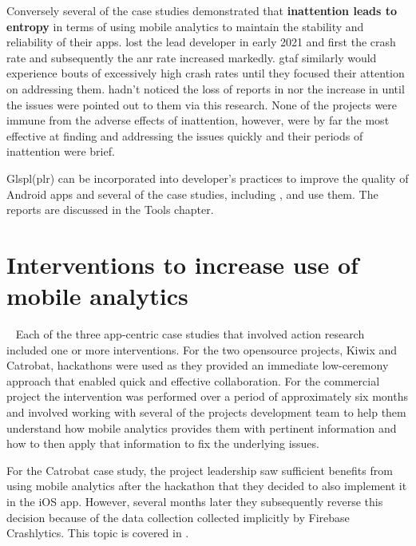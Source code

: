 Conversely several of the case studies demonstrated that \textbf{inattention leads to entropy} in terms of using mobile analytics to maintain the stability and reliability of their apps.  lost the lead developer in early 2021 and first the crash rate and subsequently the \Gls{anr} rate increased markedly. \Gls{gtaf} similarly would experience bouts of excessively high crash rates until they focused their attention on addressing them.  hadn't noticed the loss of reports in  nor the increase in  until the issues were pointed out to them via this research. None of the projects were immune from the adverse effects of inattention, however,  were by far the most effective at finding and addressing the issues quickly and their periods of inattention were brief.

Glspl(plr) can be incorporated into developer's practices to improve the quality of Android apps and several of the case studies, including ,  and  use them. The reports are discussed in the Tools chapter.


\section{Interventions to increase use of mobile analytics}~\label{aiu-interventions-theme}
Each of the three app-centric case studies that involved action research included one or more interventions. For the two opensource projects, Kiwix and Catrobat, hackathons were used as they provided an immediate low-ceremony approach that enabled quick and effective collaboration. For the commercial project the intervention was performed over a period of approximately six months and involved working with several of the projects development team to help them understand how mobile analytics provides them with pertinent information and how to then apply that information to fix the underlying issues. 

For the Catrobat case study, the project leadership saw sufficient benefits from using mobile analytics after the hackathon that they decided to also implement it in the iOS app. However, several months later they subsequently reverse this decision because of the data collection collected implicitly by Firebase Crashlytics. This topic is covered in .


